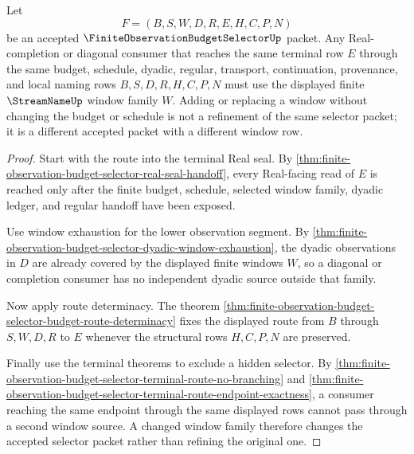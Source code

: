 \begin{theorem}
\label{thm:finite-observation-budget-selector-real-seal-window-saturation}
Let
$$
F=(B,S,W,D,R,E,H,C,P,N)
$$
be an accepted $\FiniteObservationBudgetSelectorUp$ packet. Any Real-completion or diagonal consumer that reaches the same terminal row $E$ through the same budget, schedule, dyadic, regular, transport, continuation, provenance, and local naming rows $B,S,D,R,H,C,P,N$ must use the displayed finite $\StreamNameUp$ window family $W$. Adding or replacing a window without changing the budget or schedule is not a refinement of the same selector packet; it is a different accepted packet with a different window row.
\end{theorem}
\begin{proof}
Start with the route into the terminal Real seal. By \autoref{thm:finite-observation-budget-selector-real-seal-handoff}, every Real-facing read of $E$ is reached only after the finite budget, schedule, selected window family, dyadic ledger, and regular handoff have been exposed.

Use window exhaustion for the lower observation segment. By \autoref{thm:finite-observation-budget-selector-dyadic-window-exhaustion}, the dyadic observations in $D$ are already covered by the displayed finite windows $W$, so a diagonal or completion consumer has no independent dyadic source outside that family.

Now apply route determinacy. The theorem \autoref{thm:finite-observation-budget-selector-budget-route-determinacy} fixes the displayed route from $B$ through $S,W,D,R$ to $E$ whenever the structural rows $H,C,P,N$ are preserved.

Finally use the terminal theorems to exclude a hidden selector. By \autoref{thm:finite-observation-budget-selector-terminal-route-no-branching} and \autoref{thm:finite-observation-budget-selector-terminal-route-endpoint-exactness}, a consumer reaching the same endpoint through the same displayed rows cannot pass through a second window source. A changed window family therefore changes the accepted selector packet rather than refining the original one.
\end{proof}

